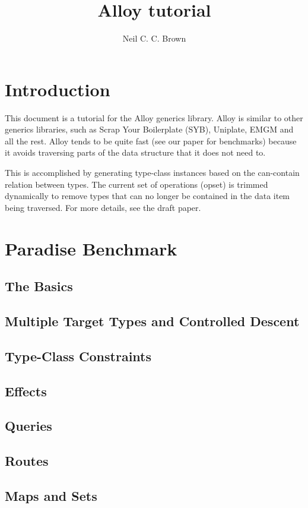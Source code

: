 \documentclass{article}
\title{Alloy tutorial}
\author{Neil C. C. Brown}
\begin{document}
\maketitle

\section*{Introduction}

This document is a tutorial for the Alloy generics library.  Alloy is similar
to other generics libraries, such as Scrap Your Boilerplate (SYB), Uniplate,
EMGM and all the rest.  Alloy tends to be quite fast (see our paper for
benchmarks) because it avoids traversing parts of the data structure that it
does not need to.

This is accomplished by generating type-class instances based on the
can-contain relation between types.  The current set of operations (opset) is
trimmed dynamically to remove types that can no longer be contained in the
data item being traversed.  For more details, see the draft paper.


\newpage
\section{Paradise Benchmark}

\newpage
\subsection{The Basics}


\newpage
\subsection{Multiple Target Types and Controlled Descent}

\subsection{Type-Class Constraints}


\newpage
\subsection{Effects}

\newpage


\newpage
\subsection{Queries}


\newpage
\subsection{Routes}


\newpage
\subsection{Maps and Sets}




\end{document}

